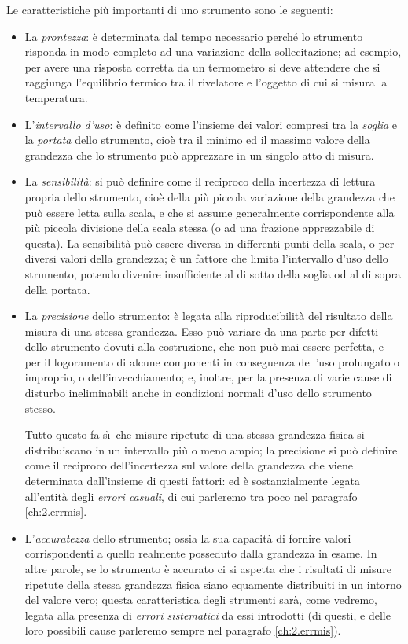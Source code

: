 %
Le caratteristiche pi\`u importanti di uno strumento sono le
seguenti:
\begin{itemize}
\item La \emph{prontezza}: \`e determinata dal tempo
  necessario perch\'e lo strumento risponda in modo completo
  ad una variazione della sollecitazione; ad esempio, per
  avere una risposta corretta da un termometro si deve
  attendere che si raggiunga l'equilibrio termico tra il
  rivelatore e l'oggetto di cui si misura la temperatura.
\item L'\emph{intervallo d'uso}: \`e definito come l'insieme
  dei valori compresi tra la \emph{soglia} e la
  \emph{portata} dello strumento, cio\`e tra il minimo ed il
  massimo valore della grandezza che lo strumento pu\`o
  apprezzare in un singolo atto di misura.
\item La \emph{sensibilit\`a}: si pu\`o definire come il
  reciproco della incertezza di lettura propria dello
  strumento, cio\`e della pi\`u piccola variazione della
  grandezza che pu\`o essere letta sulla scala, e che si
  assume generalmente corrispondente alla pi\`u piccola
  divisione della scala stessa (o ad una frazione
  apprezzabile di questa).  La sensibilit\`a pu\`o essere
  diversa in differenti punti della scala, o per diversi
  valori della grandezza; \`e un fattore che limita
  l'intervallo d'uso dello strumento, potendo divenire
  insufficiente al di sotto della soglia od al di sopra
  della portata.
\item La \emph{precisione} dello strumento: \`e legata alla
  riproducibilit\`a del risultato della misura di una stessa
  grandezza.  Esso pu\`o variare da una parte per difetti
  dello strumento dovuti alla costruzione, che non pu\`o mai
  essere perfetta, e per il logoramento di alcune componenti
  in conseguenza dell'uso prolungato o improprio, o
  dell'invecchiamento; e, inoltre, per la presenza di varie
  cause di disturbo ineliminabili anche in condizioni
  normali d'uso dello strumento stesso.

  Tutto questo fa s\`\i\ che misure ripetute di una stessa
  grandezza fisica si distribuiscano in un intervallo pi\`u
  o meno ampio; la precisione si pu\`o definire come il
  reciproco dell'incertezza sul valore della grandezza che
  viene determinata dall'insieme di questi fattori: ed \`e
  sostanzialmente legata all'entit\`a degli \emph{errori
    casuali}, di cui parleremo tra poco nel paragrafo
  \ref{ch:2.errmis}.

\item L'\emph{accuratezza} dello strumento; ossia la sua
  capacit\`a di fornire valori corrispondenti a quello
  realmente posseduto dalla grandezza in esame.  In altre
  parole, se lo strumento \`e accurato ci si aspetta che i
  risultati di misure ripetute della stessa grandezza fisica
  siano equamente distribuiti in un intorno del valore vero;
  questa caratteristica degli strumenti sar\`a, come
  vedremo, legata alla presenza di \emph{errori sistematici}
  da essi introdotti (di questi, e delle loro possibili
  cause parleremo sempre nel paragrafo \ref{ch:2.errmis}).


\end{itemize}
